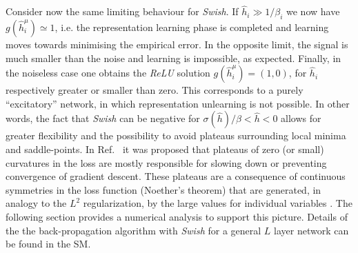 \documentclass[5p]{elsarticle}
\begin{document}
Consider now the same limiting behaviour for {\it Swish}. If $\hat{h}_i \gg 1/\beta_i$ we now have $g(\hat{h}^{\mu}_i)\simeq 1$, i.e. the representation learning phase is completed and learning moves towards minimising the empirical error. In the opposite limit, the signal is much smaller than the noise and learning is impossible, as expected. Finally, in the noiseless case one obtains the {\it ReLU} solution $g(\hat{h}^{\mu}_i) = (1, 0) $, for $\hat{h}_i $ respectively greater or smaller than zero. This corresponds to a purely ``excitatory'' network, in which representation unlearning is not possible. In other words, the fact that {\it Swish} can be negative for $\sigma(\hat{h})/\beta <\hat{h}<0$ allows for greater flexibility and the possibility to avoid plateaus surrounding local minima and saddle-points. In Ref.~\cite{dauphin} it was proposed that plateaus of zero (or small) curvatures in the loss are mostly responsible for slowing down or preventing convergence of gradient descent. These plateaus are a consequence of continuous symmetries in the loss function (Noether's theorem) that are generated, in analogy to the $L^2$ regularization, by the large values for individual variables \cite{energyland}. The following section provides a numerical analysis to support this picture. Details of the the back-propagation algorithm with {\it Swish} for a general $L$ layer network can be found in the SM.
%
\end{document}

